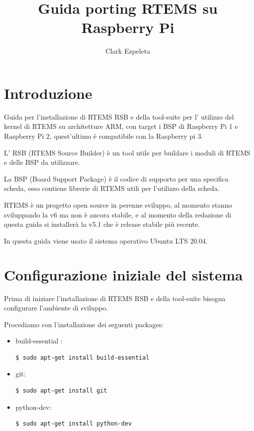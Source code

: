 \documentclass[10pt, a4paper]{article}
\title{Guida porting RTEMS su Raspberry Pi}
\author{Clark Ezpeleta}
\date{}
\begin{document}
\maketitle
\newpage
\tableofcontents
\newpage
{}
\begin{flushleft}
\section{Introduzione}
Guida per l'installazione di RTEMS RSB e della tool-suite per l' utilizzo del kernel di RTEMS su architetture ARM, con target i BSP di Raspberry Pi 1 e Raspberry Pi 2, quest'ultimo è compatibile con la Raspberry pi 3.

L' RSB (RTEMS Source Builder) è un tool utile per buildare i moduli di RTEMS e delle BSP da utilizzare.

La BSP (Board Support Package) è il codice di supporto per una specifica scheda, esso contiene librerie di RTEMS utili per l'utilizzo della scheda.

RTEMS è un progetto open source in perenne sviluppo, al momento stanno sviluppando la v6 ma non è ancora stabile, e al momento della redazione di questa guida si installerà la v5.1 che è release stabile più recente.

In questa guida viene usato il sistema operativo Ubuntu LTS 20.04.

\newpage
\section{Configurazione iniziale del sistema}
Prima di iniziare l'installazione di RTEMS RSB e della tool-suite bisogna configurare l'ambiente di sviluppo.

Procediamo con l'installazione dei seguenti packages:
\begin{itemize}
\item  build-essential : 
\begin{lstlisting}[language=bash] 
$ sudo apt-get install build-essential
\end{lstlisting}
\item git:
\begin{lstlisting}[language=bash] 
$ sudo apt-get install git
\end{lstlisting}
\item python-dev:
\begin{lstlisting}[language=bash] 
 $ sudo apt-get install python-dev
 \end{lstlisting}
\end{itemize}


\end{flushleft}
\end{document}
